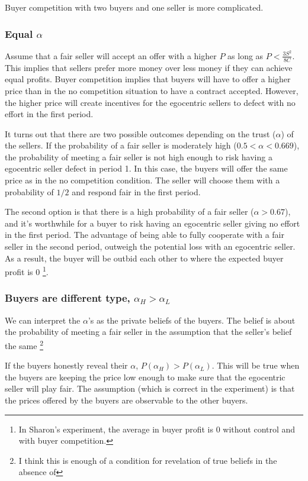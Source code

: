\documentclass{article}
\begin{document}
Buyer competition with two buyers and one seller is more complicated. 

\subsubsection{Equal $\alpha$}

Assume that a fair seller will accept an offer with a higher $P$ as long as $P < \frac{3S^2}{8C}$. This implies that sellers prefer more money over less money if they can achieve equal profits. Buyer competition implies that buyers will have to offer a higher price than in the no competition situation to have a contract accepted. However, the higher price will create incentives for the egocentric sellers to defect with no effort in the first period.

It turns out that there are two possible outcomes depending on the trust ($\alpha$) of the sellers. If the probability of a fair seller is moderately high ($0.5 < \alpha < 0.669$), the probability of meeting a fair seller is not high enough to risk having a egocentric seller defect in period 1. In this case, the buyers will offer the same price as in the no competition condition. The seller will choose them with a probability of $1/2$ and respond fair in the first period. 

The second option is that there is a high probability of a fair seller ($\alpha > 0.67$), and it's worthwhile for a buyer to risk having an egocentric seller giving no effort in the first period. The advantage of being able to fully cooperate with a fair seller in the second period, outweigh the potential loss with an egocentric seller. As a result, the buyer will be outbid each other to where the expected buyer profit is 0 \footnote{In Sharon's experiment, the average in buyer profit is 0 without control and with buyer competition.}.

\subsubsection{Buyers are different type, $\alpha_H > \alpha_L$}

We can interpret the $\alpha$'s as the private beliefs of the buyers. The belief is about the probability of meeting a fair seller in the assumption that the seller's belief the same \footnote{I think this is enough of a condition for revelation of true beliefs in the absence of }

If the buyers honestly reveal their $\alpha$, $P(\alpha_H) > P(\alpha_L)$. This will be true when the buyers are keeping the price low enough to make sure that the egocentric seller will play fair. The assumption (which is correct in the experiment) is that the prices offered by the buyers are observable to the other buyers.
\end{document}
